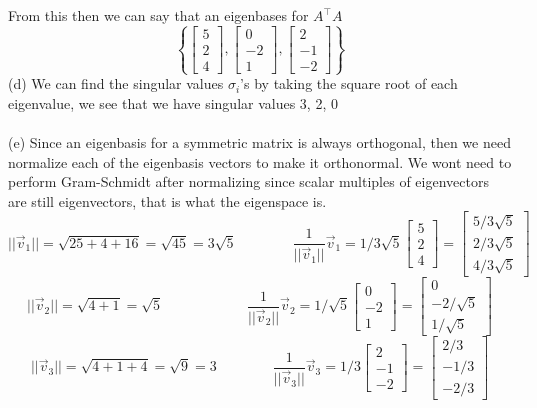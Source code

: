 \documentclass{report}
\begin{document}
From this then we can say that an eigenbases for $A^\top A$
$$
\left\{
\begin{bmatrix}5\\2\\4\end{bmatrix},\begin{bmatrix}0\\-2\\1\end{bmatrix},\begin{bmatrix}2\\-1\\-2\end{bmatrix}
\right\}
$$
(d) We can find the singular values $\sigma_i$'s by taking the square root of each eigenvalue, we see that we have singular values 3, 2, 0 \\
\\
\noindent (e) Since an eigenbasis for a symmetric matrix is always orthogonal, then we need normalize each of the eigenbasis vectors to make it orthonormal. We wont need to perform Gram-Schmidt after normalizing since scalar multiples of eigenvectors are still eigenvectors,  that is what the eigenspace is.
$$
||\vec{v}_1|| = \sqrt{25 + 4 + 16} = \sqrt{45} = 3\sqrt{5}\qquad\qquad\frac{1}{||\vec{v}_1||}\vec{v}_1 = 1/3\sqrt{5}\begin{bmatrix}5\\2\\4\end{bmatrix}=\begin{bmatrix}5/3\sqrt{5}\\2/3\sqrt{5}\\4/3\sqrt{5}\end{bmatrix}
$$
$$
||\vec{v}_2|| = \sqrt{4+1} = \sqrt{5}\qquad\qquad\qquad\frac{1}{||\vec{v}_2||}\vec{v}_2 = 1/\sqrt{5}\begin{bmatrix}0\\-2\\1\end{bmatrix} = \begin{bmatrix}0\\-2/\sqrt{5}\\1/\sqrt{5}\end{bmatrix}
$$
$$
||\vec{v}_3|| = \sqrt{4+1+4} = \sqrt{9} = 3\qquad\qquad\frac{1}{||\vec{v}_3||}\vec{v}_3 = 1/3\begin{bmatrix}2\\-1\\-2\end{bmatrix} = \begin{bmatrix}2/3\\-1/3\\-2/3\end{bmatrix}
$$
\end{document}
